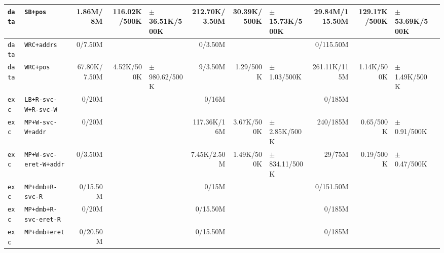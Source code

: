 \begin{tabular}{l l  | r r l | r r l | r r l l}
           \verb|data| &                                               \verb|SB+pos| &       1.86M/8M &          116.02K/500K & $\pm$ 36.51K/500K &  212.70K/3.50M &           30.39K/500K & $\pm$ 15.73K/500K & 29.84M/115.50M &          129.17K/500K &  $\pm$ 53.69K/500K & \\ \hline 
           \verb|data| &                                            \verb|WRC+addrs| &        0/7.50M &                       &                   &        0/3.50M &                       &                   &      0/115.50M &                       &                    & \\ \hline 
           \verb|data| &                                              \verb|WRC+pos| &   67.80K/7.50M &            4.52K/500K & $\pm$ 980.62/500K &        9/3.50M &             1.29/500K &   $\pm$ 1.03/500K &   261.11K/115M &            1.14K/500K &   $\pm$ 1.49K/500K & \\ \hline 
            \verb|exc| &                                   \verb|LB+R-svc-W+R-svc-W| &          0/20M &                       &                   &          0/16M &                       &                   &         0/185M &                       &                    & \\ \hline 
            \verb|exc| &                                      \verb|MP+W-svc-W+addr| &          0/20M &                       &                   &    117.36K/16M &            3.67K/500K &  $\pm$ 2.85K/500K &       240/185M &             0.65/500K &    $\pm$ 0.91/500K & \\ \hline 
            \verb|exc| &                                 \verb|MP+W-svc-eret-W+addr| &        0/3.50M &                       &                   &    7.45K/2.50M &            1.49K/500K & $\pm$ 834.11/500K &         29/75M &             0.19/500K &    $\pm$ 0.47/500K & \\ \hline 
            \verb|exc| &                                       \verb|MP+dmb+R-svc-R| &       0/15.50M &                       &                   &          0/15M &                       &                   &      0/151.50M &                       &                    & \\ \hline 
            \verb|exc| &                                  \verb|MP+dmb+R-svc-eret-R| &          0/20M &                       &                   &       0/15.50M &                       &                   &         0/185M &                       &                    & \\ \hline 
            \verb|exc| &                                          \verb|MP+dmb+eret| &       0/20.50M &                       &                   &       0/15.50M &                       &                   &         0/185M &                       &                    & \\ \hline 

\end{tabular}
